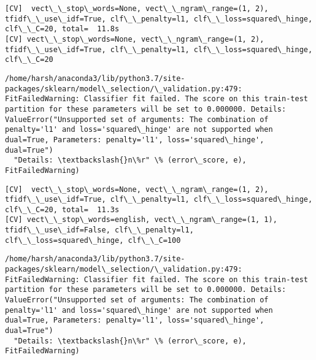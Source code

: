 \documentclass[11pt]{article}
\begin{document}
    \begin{Verbatim}[commandchars=\\\{\}]
[CV]  vect\_\_stop\_words=None, vect\_\_ngram\_range=(1, 2), tfidf\_\_use\_idf=True, clf\_\_penalty=l1, clf\_\_loss=squared\_hinge, clf\_\_C=20, total=  11.8s
[CV] vect\_\_stop\_words=None, vect\_\_ngram\_range=(1, 2), tfidf\_\_use\_idf=True, clf\_\_penalty=l1, clf\_\_loss=squared\_hinge, clf\_\_C=20 

    \end{Verbatim}

    \begin{Verbatim}[commandchars=\\\{\}]
/home/harsh/anaconda3/lib/python3.7/site-packages/sklearn/model\_selection/\_validation.py:479: FitFailedWarning: Classifier fit failed. The score on this train-test partition for these parameters will be set to 0.000000. Details: 
ValueError("Unsupported set of arguments: The combination of penalty='l1' and loss='squared\_hinge' are not supported when dual=True, Parameters: penalty='l1', loss='squared\_hinge', dual=True")
  "Details: \textbackslash{}n\%r" \% (error\_score, e), FitFailedWarning)

    \end{Verbatim}

    \begin{Verbatim}[commandchars=\\\{\}]
[CV]  vect\_\_stop\_words=None, vect\_\_ngram\_range=(1, 2), tfidf\_\_use\_idf=True, clf\_\_penalty=l1, clf\_\_loss=squared\_hinge, clf\_\_C=20, total=  11.3s
[CV] vect\_\_stop\_words=english, vect\_\_ngram\_range=(1, 1), tfidf\_\_use\_idf=False, clf\_\_penalty=l1, clf\_\_loss=squared\_hinge, clf\_\_C=100 

    \end{Verbatim}

    \begin{Verbatim}[commandchars=\\\{\}]
/home/harsh/anaconda3/lib/python3.7/site-packages/sklearn/model\_selection/\_validation.py:479: FitFailedWarning: Classifier fit failed. The score on this train-test partition for these parameters will be set to 0.000000. Details: 
ValueError("Unsupported set of arguments: The combination of penalty='l1' and loss='squared\_hinge' are not supported when dual=True, Parameters: penalty='l1', loss='squared\_hinge', dual=True")
  "Details: \textbackslash{}n\%r" \% (error\_score, e), FitFailedWarning)

    \end{Verbatim}
\end{document}
